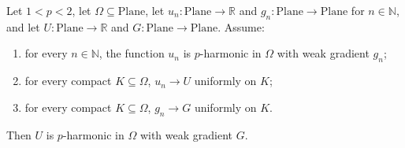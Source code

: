 \begin{lemma}
Let $1<p<2$, let $\Omega\subseteq\mathrm{Plane}$, let $u_n\colon\mathrm{Plane}\to\mathbb{R}$ and
$g_n\colon\mathrm{Plane}\to\mathrm{Plane}$ for $n\in\mathbb{N}$, and let
$U\colon\mathrm{Plane}\to\mathbb{R}$ and $G\colon\mathrm{Plane}\to\mathrm{Plane}$.  Assume:
\begin{enumerate}
\item for every $n\in\mathbb{N}$, the function $u_n$ is $p$-harmonic in $\Omega$ with weak
gradient $g_n$;
\item for every compact $K\subseteq\Omega$, $u_n\to U$ uniformly on $K$;
\item for every compact $K\subseteq\Omega$, $g_n\to G$ uniformly on $K$.
\end{enumerate}
Then $U$ is $p$-harmonic in $\Omega$ with weak gradient $G$.
\end{lemma}
